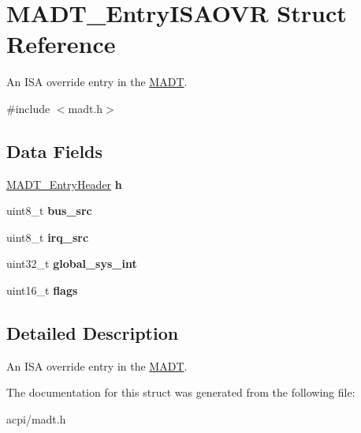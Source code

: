 \hypertarget{structMADT__EntryISAOVR}{}\section{M\+A\+D\+T\+\_\+\+Entry\+I\+S\+A\+O\+VR Struct Reference}
\label{structMADT__EntryISAOVR}


An I\+SA override entry in the \hyperlink{structMADT}{M\+A\+DT}.  




{\ttfamily \#include $<$madt.\+h$>$}

\subsection*{Data Fields}
\begin{DoxyCompactItemize}
\item 
\hyperlink{structMADT__EntryHeader}{M\+A\+D\+T\+\_\+\+Entry\+Header} {\bfseries h}\hypertarget{structMADT__EntryISAOVR_a551538eb3add84ba3906fc202b069a02}{}\label{structMADT__EntryISAOVR_a551538eb3add84ba3906fc202b069a02}

\item 
uint8\+\_\+t {\bfseries bus\+\_\+src}\hypertarget{structMADT__EntryISAOVR_a96814fd51ec2453e549dc4bd1e339a8e}{}\label{structMADT__EntryISAOVR_a96814fd51ec2453e549dc4bd1e339a8e}

\item 
uint8\+\_\+t {\bfseries irq\+\_\+src}\hypertarget{structMADT__EntryISAOVR_ab5c3f076f47c33c16385318e49d0b610}{}\label{structMADT__EntryISAOVR_ab5c3f076f47c33c16385318e49d0b610}

\item 
uint32\+\_\+t {\bfseries global\+\_\+sys\+\_\+int}\hypertarget{structMADT__EntryISAOVR_af957a5160aa0f282f90a5638741e0602}{}\label{structMADT__EntryISAOVR_af957a5160aa0f282f90a5638741e0602}

\item 
uint16\+\_\+t {\bfseries flags}\hypertarget{structMADT__EntryISAOVR_ab393406060b9ddadc75dfecdc5c17f58}{}\label{structMADT__EntryISAOVR_ab393406060b9ddadc75dfecdc5c17f58}

\end{DoxyCompactItemize}


\subsection{Detailed Description}
An I\+SA override entry in the \hyperlink{structMADT}{M\+A\+DT}. 

The documentation for this struct was generated from the following file\+:\begin{DoxyCompactItemize}
\item 
acpi/madt.\+h\end{DoxyCompactItemize}
